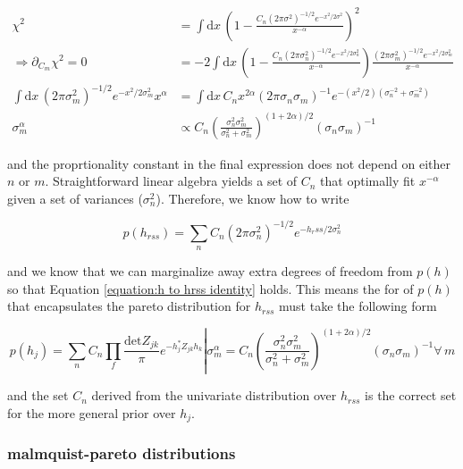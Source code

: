 \documentclass[10pt]{article}
\begin{document}
\begin{subequations}
\begin{align}
\chi^2 & = \int\mathrm{d}x\, \left( 1 - \frac{C_n (2\pi \sigma^2)^{-1/2} e^{-x^2/2\sigma^2}}{x^{-\alpha}}\right)^2 \\
\Rightarrow \partial_{C_m} \chi^2 = 0 & = -2 \int\mathrm{d}x\, \left( 1 - \frac{C_n (2\pi \sigma_n^2)^{-1/2} e^{-x^2/2\sigma_n^2}}{x^{-\alpha}}\right) \frac{(2\pi \sigma_m^2)^{-1/2} e^{-x^2/2\sigma_m^2}}{x^{-\alpha}} \\
\int\mathrm{d}x\, (2\pi \sigma_m^2)^{-1/2} e^{-x^2/2\sigma_m^2} x^\alpha & = \int\mathrm{d}x\,  C_n x^{2\alpha} (2\pi \sigma_n \sigma_m)^{-1} e^{-(x^2/2)(\sigma_n^{-2}+\sigma_m^{-2})} \\ 
\sigma_m^\alpha & \propto C_n \left(\frac{\sigma_n^2\sigma_m^2}{\sigma_n^2+\sigma_m^2}\right)^{(1+2\alpha)/2} (\sigma_n \sigma_m)^{-1} 
\end{align}
\end{subequations}

and the proprtionality constant in the final expression does not depend on either $n$ or $m$. Straightforward linear algebra yields a set of $C_n$ that optimally fit $x^{-\alpha}$ given a set of variances ($\sigma_n^2$). Therefore, we know how to write 

\begin{equation}
p(h_{rss}) = \sum\limits_n C_n (2\pi\sigma_n^2)^{-1/2} e^{-h_rss/2\sigma_n^2}
\end{equation}

and we know that we can marginalize away extra degrees of freedom from $p(h)$ so that Equation \ref{equation:h to hrss identity} holds. This means the for of $p(h)$ that encapsulates the pareto distribution for $h_{rss}$ must take the following form

\begin{equation}
p(h_j) = \sum_n C_n  \prod\limits_{f} \frac{\mathrm{det}Z_{jk}}{\pi} e^{- h_j^\ast Z_{jk} h_k } \left| \sigma_m^\alpha = C_n \left(\frac{\sigma_n^2\sigma_m^2}{\sigma_n^2+\sigma_m^2}\right)^{(1+2\alpha)/2} (\sigma_n \sigma_m)^{-1} \forall\, m \right.
\end{equation}

and the set $C_n$ derived from the univariate distribution over $h_{rss}$ is the correct set for the more general prior over $h_j$.

\subsubsection{malmquist-pareto distributions}
\end{document}
